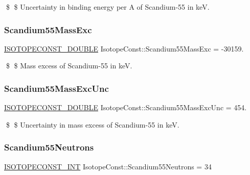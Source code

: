 \$ \$ Uncertainty in binding energy per A of Scandium-\/55 in keV. \mbox{\label{group___isotope_const-_scandium-_sc55_ga759dd57f125cdc792574c09b71a98a5f}} 
\subsubsection{\texorpdfstring{Scandium55\+Mass\+Exc}{Scandium55MassExc}}
{\footnotesize\ttfamily \mbox{\hyperlink{group___isotope_const-_macros_ga8f45a7272ce02c0b4c65c44636ed719a}{I\+S\+O\+T\+O\+P\+E\+C\+O\+N\+S\+T\+\_\+\+D\+O\+U\+B\+LE}} Isotope\+Const\+::\+Scandium55\+Mass\+Exc = -\/30159.}

\$ \$ Mass excess of Scandium-\/55 in keV. \mbox{\label{group___isotope_const-_scandium-_sc55_ga52e3a930458e606491d33c4a65213996}} 
\subsubsection{\texorpdfstring{Scandium55\+Mass\+Exc\+Unc}{Scandium55MassExcUnc}}
{\footnotesize\ttfamily \mbox{\hyperlink{group___isotope_const-_macros_ga8f45a7272ce02c0b4c65c44636ed719a}{I\+S\+O\+T\+O\+P\+E\+C\+O\+N\+S\+T\+\_\+\+D\+O\+U\+B\+LE}} Isotope\+Const\+::\+Scandium55\+Mass\+Exc\+Unc = 454.}

\$ \$ Uncertainty in mass excess of Scandium-\/55 in keV. \mbox{\label{group___isotope_const-_scandium-_sc55_ga473dd1d84efff821a859b0cbd769fe4d}} 
\subsubsection{\texorpdfstring{Scandium55\+Neutrons}{Scandium55Neutrons}}
{\footnotesize\ttfamily \mbox{\hyperlink{group___isotope_const-_macros_ga5f18360b3e99483a35c32d789e62621c}{I\+S\+O\+T\+O\+P\+E\+C\+O\+N\+S\+T\+\_\+\+I\+NT}} Isotope\+Const\+::\+Scandium55\+Neutrons = 34}

